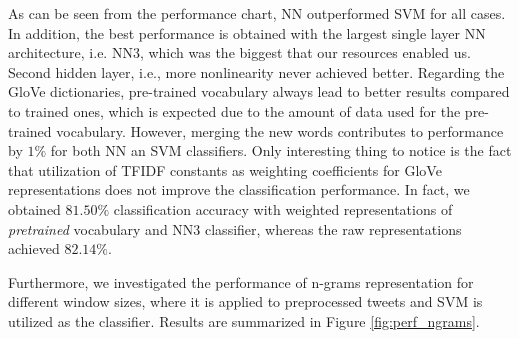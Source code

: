 As can be seen from the performance chart, NN outperformed SVM for all cases.
In addition, the best performance is obtained with the largest single layer NN architecture, i.e. NN3, which was the biggest that our resources enabled us.
Second hidden layer, i.e., more nonlinearity never achieved better.
Regarding the GloVe dictionaries, pre-trained vocabulary always lead to better results compared to trained ones, which is expected due to the amount of data used for the pre-trained vocabulary.
However, merging the new words contributes to performance by $1\%$ for both NN an SVM classifiers.
Only interesting thing to notice is the fact that utilization of TFIDF constants as weighting coefficients for GloVe representations does not improve the classification performance.
In fact, we obtained $81.50\%$ classification accuracy with weighted representations of \textit{pretrained} vocabulary and NN3 classifier, whereas the raw representations achieved $82.14\%$.

Furthermore, we investigated the performance of n-grams representation for different window sizes, where it is applied to preprocessed tweets and SVM is utilized as the classifier.
Results are summarized in Figure \ref{fig:perf_ngrams}.

